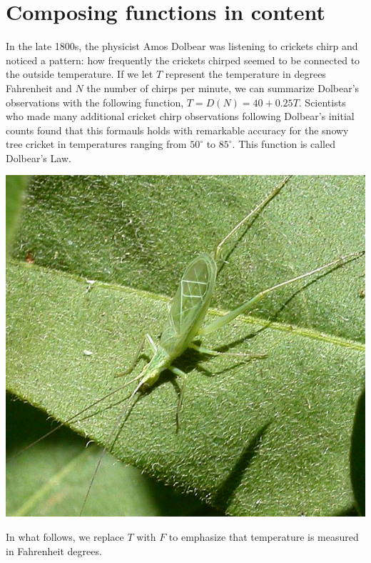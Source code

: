 \documentclass{ximera}
\begin{document}

\section{Composing functions in content}
In the late 1800s, the physicist Amos Dolbear was listening to crickets chirp and noticed a pattern: how frequently the crickets chirped seemed to be connected to the outside temperature. If we let $T$ represent the temperature in degrees Fahrenheit and $N$ the number of chirps per minute, we can summarize Dolbear's observations with the following function, $T=D(N)=40+0.25T$.  Scientists who made many additional cricket chirp observations following Dolbear's initial counts found that this formauls holds with remarkable accuracy for the snowy tree cricket in temperatures ranging from $50^\circ$ to $85^\circ$.  This function is called Dolbear's Law.

\begin{image}
\includegraphics{CompositionText3.jpg}
\end{image}

In what follows, we replace $T$ with $F$ to emphasize that temperature is measured in Fahrenheit degrees.
\end{document}
